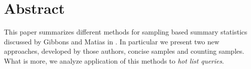 \section{Abstract}
This paper summarizes different methods for sampling based summary
statistics discussed by Gibbons and Matias in
\cite{GM98}. In particular we present two new approaches, developed by
those authors, concise samples and counting samples. What is more, we
analyze application of this methods to \textit{hot list queries}.

